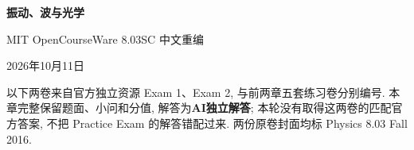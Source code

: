 \frontmatter
\thispagestyle{cover}
\begin{center}{\color{structurecolor}\bfseries\fontsize{17}{23}\selectfont 振动、波与光学}\par
\vspace{5pt}{\bfseries 从振子到波动成像}\par
\vspace{5pt}MIT OpenCourseWare 8.03SC 中文重编\par
2026年10月11日\end{center}

\clearpage
\originalcontents
\clearpage
\mainmatter

















\label{ch:actual-exams}
以下两卷来自官方独立资源 Exam 1、Exam 2, 与前两章五套练习卷分别编号. 本章完整保留题面、小问和分值, 解答为\textbf{AI独立解答}; 本轮没有取得这两卷的匹配官方答案, 不把 Practice Exam 的解答错配过来. 两份原卷封面均标 Physics 8.03 Fall 2016.




